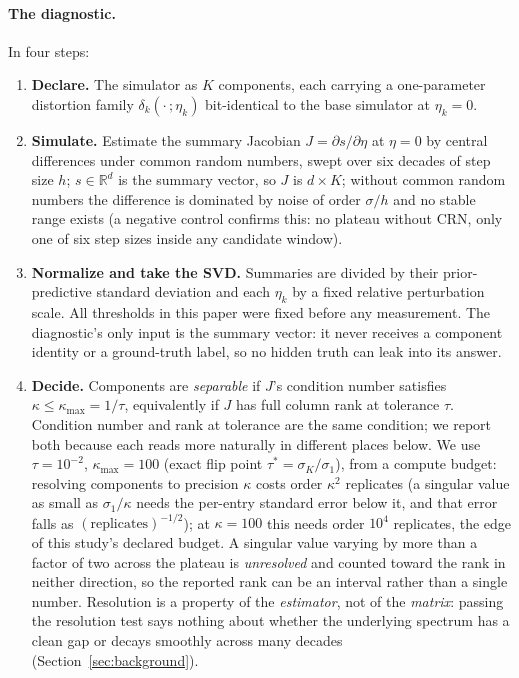 \documentclass{article}
\begin{document}
\paragraph{The diagnostic.}
In four steps:
\begin{enumerate}[topsep=1pt,itemsep=1pt,parsep=0pt,leftmargin=*]
\item \textbf{Declare.} The simulator as $K$ components, each carrying a one-parameter distortion
family $\delta_k(\cdot\,;\eta_k)$ bit-identical to the base simulator at $\eta_k=0$.
\item \textbf{Simulate.} Estimate the summary Jacobian $J=\partial s/\partial\eta$ at $\eta=0$ by
central differences under common random numbers, swept over six decades of step size $h$;
$s\in\mathbb{R}^d$ is the summary vector, so $J$ is $d\times K$;
without common random numbers the difference is dominated by noise of order $\sigma/h$ and no
stable range exists (a negative control confirms this: no plateau without CRN, only one of six
step sizes inside any candidate window).
\item \textbf{Normalize and take the SVD.} Summaries are divided by their prior-predictive
standard deviation and each $\eta_k$ by a fixed relative perturbation scale. All thresholds in
this paper were fixed before any measurement. The diagnostic's only input is the
summary vector: it never receives a component identity or a ground-truth label, so no hidden
truth can leak into its answer.
\item \textbf{Decide.} Components are \emph{separable} if $J$'s condition number satisfies
$\kappa \le \kappa_{\max}=1/\tau$, equivalently if $J$ has full column rank at tolerance
$\tau$. Condition number and rank at tolerance are the same condition; we report both because
each reads more naturally in different places below. We use
$\tau=10^{-2}$, $\kappa_{\max}=100$ (exact flip point $\tau^*=\sigma_K/\sigma_1$), from a
compute budget: resolving components to precision
$\kappa$ costs order $\kappa^2$ replicates (a singular value as small as $\sigma_1/\kappa$
needs the per-entry standard error below it, and that error falls as
$(\text{replicates})^{-1/2}$); at $\kappa=100$ this needs order $10^4$ replicates, the edge
of this study's declared budget. A
singular value varying by more than a factor of two across the plateau is \emph{unresolved} and
counted toward the rank in neither direction, so the reported rank can be an interval rather than
a single number. Resolution is a property of the
\emph{estimator}, not of the \emph{matrix}: passing the resolution test says nothing about
whether the underlying spectrum has a clean gap or decays smoothly across many decades
(Section~\ref{sec:background}).
\end{enumerate}
\end{document}
